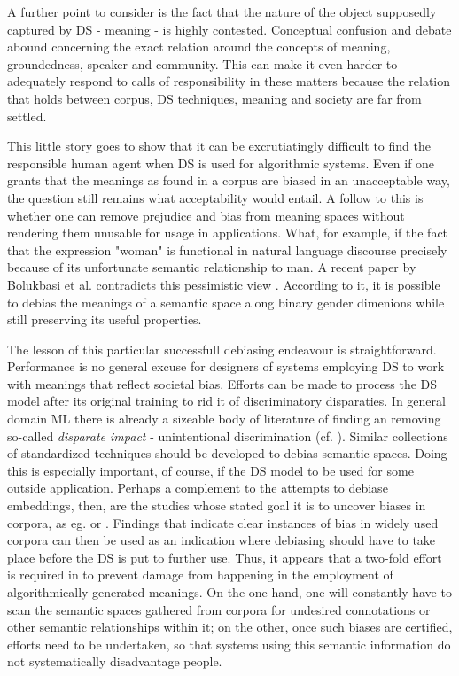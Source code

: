 \documentclass{article}
\begin{document}
A further point to consider is the fact that the nature of the object supposedly captured by DS - meaning - is highly contested. Conceptual confusion and debate abound concerning the exact relation around the concepts of meaning, groundedness, speaker and community. This can make it even harder to adequately respond to calls of responsibility in these matters because the relation that holds between corpus, DS techniques, meaning and society are far from settled. 

This little story goes to show that it can be excrutiatingly difficult to find the responsible human agent when DS is used for algorithmic systems. Even if one grants that the meanings as found in a corpus are biased in an unacceptable way, the question still remains what acceptability would entail. A follow to this is whether one can remove prejudice and bias from meaning spaces without rendering them unusable for usage in applications. What, for example, if the fact that the expression "woman" is functional in natural language discourse precisely because of its unfortunate semantic relationship to man. A recent paper by Bolukbasi et al. contradicts this pessimistic view \cite{bolukbasi2016man}. According to it, it is possible to debias the meanings of a semantic space along binary gender dimenions while still preserving its useful properties.

The lesson of this particular successfull debiasing endeavour is straightforward. Performance is no general excuse for designers of systems employing DS to work with meanings that reflect societal bias. Efforts can be made to process the DS model after its original training to rid it of discriminatory disparaties. In general domain ML there is already a sizeable body of literature of finding an removing so-called \emph{disparate impact} - unintentional discrimination (cf. \cite{feldman2015certifying} \cite{dwork2012fairness}). 
Similar collections of standardized techniques should be developed to debias semantic spaces. Doing this is especially important, of course, if the DS model to be used for some outside application. 
Perhaps a complement to the attempts to debiase embeddings, then, are the studies whose stated goal it is to uncover biases in corpora, as eg. \cite{wagner2015s} or \cite{herbelot2012distributional}. Findings that indicate clear instances of bias in widely used corpora can then be used as an indication where  debiasing should have to take place before the DS is put to further use.
Thus, it appears that a two-fold effort is required in to prevent damage from happening in the employment of algorithmically generated meanings. On the one hand, one will constantly have to scan the semantic spaces gathered from corpora for undesired connotations or other semantic relationships within it; on the other, once such biases are certified, efforts need to be undertaken, so that systems using this semantic information do not systematically disadvantage people.
\end{document}
